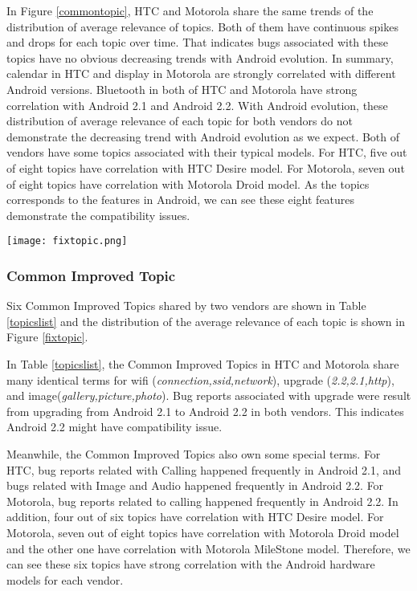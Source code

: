 \documentclass[10pt, conference, compsocconf]{IEEEtran}
\begin{document}
In Figure \ref{commontopic}, HTC and Motorola share the same trends of the distribution of average relevance of topics. Both of them have continuous spikes and drops for each topic over time. That indicates bugs associated with these topics have no obvious decreasing trends with Android evolution.
In summary, calendar in HTC and display in Motorola are strongly correlated with different Android versions. Bluetooth in both of HTC and Motorola have strong correlation with Android 2.1 and Android 2.2. With Android evolution, these distribution of average relevance of each topic for both vendors do not demonstrate the decreasing trend with Android evolution as we expect. Both of vendors have some topics associated with their typical models. For HTC, five out of eight topics have correlation with HTC Desire model. For Motorola, seven out of eight topics have correlation with Motorola Droid model. As the topics corresponds to the features in Android, we can see these eight features demonstrate the compatibility issues.

\begin{figure*}[htb]
\centering
\texttt{[image: fixtopic.png]}
\caption{Common Improved Topics in HTC and Motorola}
\label{fixtopic}
\end{figure*}

\subsubsection{Common Improved Topic}

Six Common Improved Topics shared by two vendors are shown in Table \ref{topicslist} and the distribution of the average relevance of each topic is shown in Figure \ref{fixtopic}.

In Table \ref{topicslist}, the Common Improved Topics in HTC and Motorola share many identical terms for wifi (\textit{connection,ssid,network}), upgrade (\textit{2.2,2.1,http}), and image(\textit{gallery,picture,photo}). Bug reports associated with upgrade were result from upgrading from Android 2.1 to Android 2.2 in both vendors. This indicates Android 2.2 might have compatibility issue. 

Meanwhile, the Common Improved Topics also own some special terms. For HTC, bug reports related with Calling happened frequently in Android 2.1, and bugs related with Image and Audio happened frequently in Android 2.2. For Motorola, bug reports related to calling happened frequently in Android 2.2. In addition, four out of six topics have correlation with HTC Desire model. For Motorola, seven out of eight topics have correlation with Motorola Droid model and the other one have correlation with Motorola MileStone model. Therefore, we can see these six topics have strong correlation with the Android hardware models for each vendor.
\end{document}
